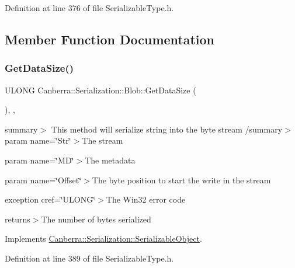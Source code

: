 Definition at line 376 of file Serializable\+Type.\+h.



\subsection{Member Function Documentation}
\mbox{\label{class_canberra_1_1_serialization_1_1_blob_af97e0642f5b289dc263650ce6dba478f_af97e0642f5b289dc263650ce6dba478f}} 
\subsubsection{\texorpdfstring{Get\+Data\+Size()}{GetDataSize()}}
{\footnotesize\ttfamily U\+L\+O\+NG Canberra\+::\+Serialization\+::\+Blob\+::\+Get\+Data\+Size (\begin{DoxyParamCaption}{ }\end{DoxyParamCaption})\hspace{0.3cm}{\ttfamily [inline]}, {\ttfamily [protected]}, {\ttfamily [virtual]}}

summary$>$ This method will serialize string into the byte stream /summary$>$ param name=\char`\"{}\+Str\char`\"{}$>$The stream

param name=\char`\"{}\+M\+D\char`\"{}$>$The metadata

param name=\char`\"{}\+Offset\char`\"{}$>$The byte position to start the write in the stream

exception cref=\char`\"{}\+U\+L\+O\+N\+G\char`\"{}$>$The Win32 error code

returns$>$The number of bytes serialized

Implements \hyperlink{class_canberra_1_1_serialization_1_1_serializable_object}{Canberra\+::\+Serialization\+::\+Serializable\+Object}.



Definition at line 389 of file Serializable\+Type.\+h.

\mbox{\label{class_canberra_1_1_serialization_1_1_blob_a3ff71c78800fdabcddcff34642efbe1f_a3ff71c78800fdabcddcff34642efbe1f}} 
